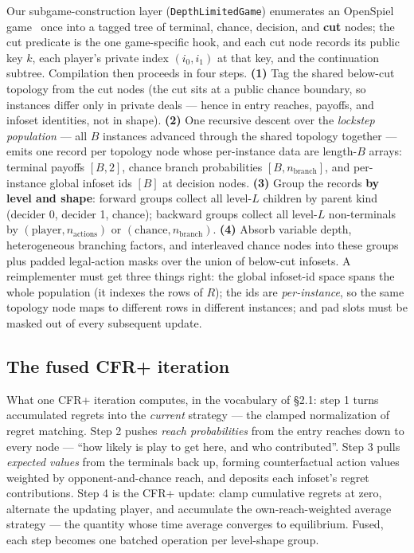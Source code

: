 \documentclass[11pt]{article}
\begin{document}
Our subgame-construction layer (\texttt{DepthLimitedGame}) enumerates an OpenSpiel
game~\citep{Lanctot2019} once into a tagged tree of terminal, chance, decision, and
\textbf{cut} nodes; the cut predicate is the one game-specific hook, and each cut node
records its public key $k$, each player's private index $(i_0, i_1)$ at that key, and
the continuation subtree. Compilation then proceeds in four steps. \textbf{(1)} Tag the
shared below-cut topology from the cut nodes (the cut sits at a public chance boundary,
so instances differ only in private deals --- hence in entry reaches, payoffs, and
infoset identities, not in shape). \textbf{(2)} One recursive descent over the
\emph{lockstep population} --- all $B$ instances advanced through the shared topology
together --- emits one record per topology node whose per-instance data are length-$B$
arrays: terminal payoffs $[B, 2]$, chance branch probabilities $[B,
n_{\text{branch}}]$, and per-instance global infoset ids $[B]$ at decision nodes.
\textbf{(3)} Group the records \textbf{by level and shape}: forward groups collect all
level-$L$ children by parent kind (decider 0, decider 1, chance); backward groups
collect all level-$L$ non-terminals by $(\text{player}, n_{\text{actions}})$ or
$(\text{chance}, n_{\text{branch}})$. \textbf{(4)} Absorb variable depth, heterogeneous
branching factors, and interleaved chance nodes into these groups plus padded
legal-action masks over the union of below-cut infosets. A reimplementer must get three
things right: the global infoset-id space spans the whole population (it indexes the
rows of $R$); the ids are \emph{per-instance}, so the same topology node maps to
different rows in different instances; and pad slots must be masked out of every
subsequent update.

\subsection{The fused CFR+ iteration}

What one CFR+ iteration computes, in the vocabulary of \S2.1: step 1 turns accumulated
regrets into the \emph{current} strategy --- the clamped normalization of regret
matching. Step 2 pushes \emph{reach probabilities} from the entry reaches down to every
node --- ``how likely is play to get here, and who contributed''. Step 3 pulls
\emph{expected values} from the terminals back up, forming counterfactual action values
weighted by opponent-and-chance reach, and deposits each infoset's regret contributions.
Step 4 is the CFR+ update: clamp cumulative regrets at zero, alternate the updating
player, and accumulate the own-reach-weighted average strategy --- the quantity whose
time average converges to equilibrium. Fused, each step becomes one batched operation
per level-shape group.
\end{document}
